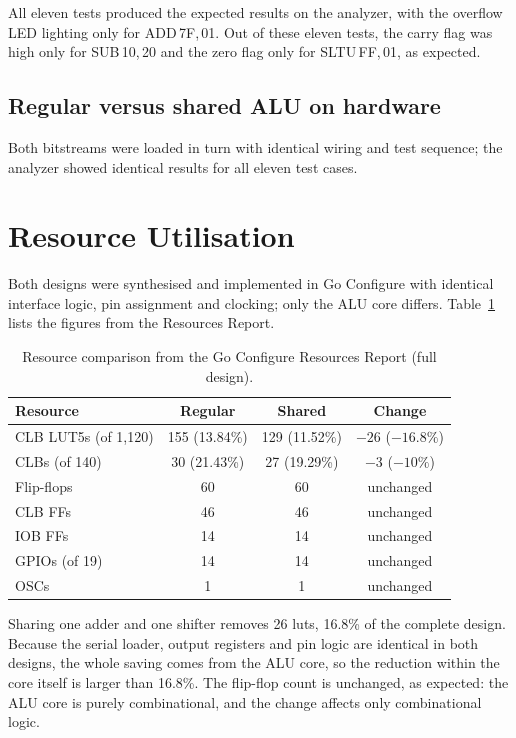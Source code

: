 \documentclass[12pt,a4paper,twoside]{article}
\begin{document}
All eleven tests produced the expected results on the analyzer, with the overflow
LED lighting only for ADD\,7F,\,01. Out of these eleven tests, the carry flag was
high only for SUB\,10,\,20 and the zero flag only for SLTU\,FF,\,01, as expected.

\subsection{Regular versus shared ALU on hardware}

Both bitstreams were loaded in turn with identical wiring and test sequence; the
analyzer showed identical results for all eleven test cases.


\section{Resource Utilisation}

Both designs were synthesised and implemented in Go Configure with identical
interface logic, pin assignment and clocking; only the ALU core differs.
Table~\ref{tab:resources} lists the figures from the Resources
Report.

\begin{table}[H]
\centering
\caption{Resource comparison from the Go Configure Resources Report (full design).}
\label{tab:resources}
\begin{tabular}{@{}lccc@{}}
\toprule
\textbf{Resource} & \textbf{Regular} & \textbf{Shared} & \textbf{Change} \\
\midrule
CLB LUT5s (of 1,120) & 155 (13.84\%) & 129 (11.52\%) & $-26$ ($-16.8\%$) \\
CLBs (of 140)        & 30 (21.43\%)  & 27 (19.29\%)  & $-3$ ($-10\%$) \\
Flip-flops           & 60            & 60            & unchanged \\
\quad CLB FFs        & 46            & 46            & unchanged \\
\quad IOB FFs        & 14            & 14            & unchanged \\
GPIOs (of 19)        & 14            & 14            & unchanged \\
OSCs                 & 1             & 1             & unchanged \\
\bottomrule
\end{tabular}
\end{table}

Sharing one adder and one shifter removes 26 \glspl{lut}, 16.8\% of the
complete design. Because the serial loader, output registers and pin logic are
identical in both designs, the whole saving comes from the ALU core, so the
reduction within the core itself is larger than 16.8\%. The flip-flop count is
unchanged, as expected: the ALU core is purely combinational, and the change affects
only combinational logic.
\end{document}
